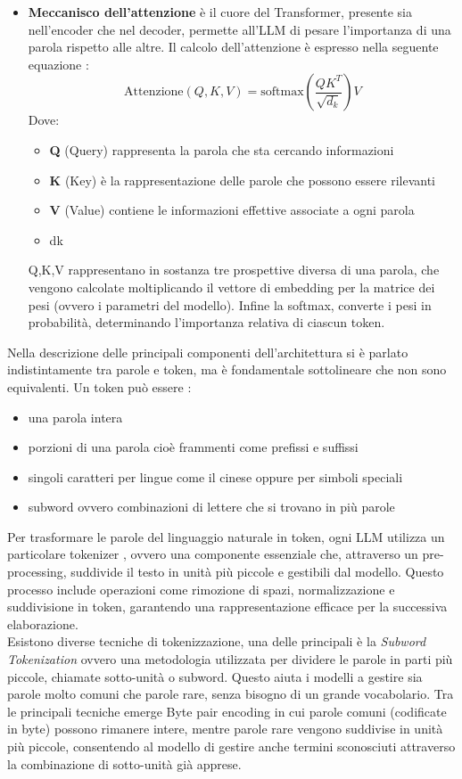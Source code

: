 \documentclass{article}
\begin{document}
\begin{itemize}
\item \textbf{Meccanisco dell'attenzione} è il cuore del Transformer, presente sia nell'encoder che nel decoder, permette all'LLM di pesare l'importanza di una parola rispetto alle altre. Il calcolo dell'attenzione è espresso nella seguente equazione \cite{vaswani2017attention}:
\[
    \text{Attenzione}(Q, K, V) = \text{softmax}\left(\frac{QK^T}{\sqrt{d_k}}\right) V
\]
Dove:
\begin{itemize}
    \item \textbf{Q} (Query) rappresenta la parola che sta cercando informazioni
    \item \textbf{K} (Key) è la rappresentazione delle parole che possono essere rilevanti
    \item \textbf{V} (Value) contiene le informazioni effettive associate a ogni parola
    \item dk
\end{itemize}
Q,K,V rappresentano in sostanza tre prospettive diversa di una parola, che vengono calcolate moltiplicando il vettore di embedding per la matrice dei pesi (ovvero i parametri del modello). Infine la softmax,  converte i pesi in probabilità, determinando l'importanza relativa di ciascun token.
\end{itemize}
Nella descrizione delle principali componenti dell'architettura si è parlato indistintamente tra parole e token, ma è fondamentale sottolineare che non sono equivalenti. Un token può essere \cite{mielke2021wordscharactersbriefhistory}:
\begin{itemize}
    \item una parola intera
    \item porzioni di una parola cioè frammenti come prefissi e suffissi 
    \item singoli caratteri per lingue come il cinese oppure per simboli speciali
    \item subword ovvero combinazioni di lettere che si trovano in più parole
\end{itemize}
Per trasformare le parole del linguaggio naturale in token, ogni LLM utilizza un particolare tokenizer \cite{huggingface_transformers_tokenizer}, ovvero una componente essenziale che, attraverso un pre-processing, suddivide il testo in unità più piccole e gestibili dal modello. Questo processo include operazioni come rimozione di spazi, normalizzazione e suddivisione in token, garantendo una rappresentazione efficace per la successiva elaborazione.\\
Esistono diverse tecniche di tokenizzazione, una delle principali è la \textit{Subword Tokenization} ovvero una metodologia utilizzata per dividere le parole in parti più piccole, chiamate sotto-unità o subword. Questo aiuta i modelli a gestire sia parole molto comuni che parole rare, senza bisogno di un grande vocabolario. Tra le principali tecniche emerge Byte pair encoding \cite{Sennrich2015NeuralMT} in cui parole comuni (codificate in byte) possono rimanere intere, mentre parole rare vengono suddivise in unità più piccole, consentendo al modello di gestire anche termini sconosciuti attraverso la combinazione di sotto-unità già apprese.\\
\end{document}
